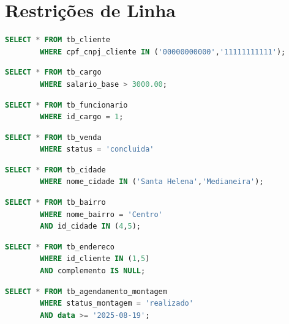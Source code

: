 \documentclass[
12pt,
a4paper,
semrecuonosumario,
sumario = abnt-6027-2012]{report}
\begin{document}
    \section{Restrições de Linha}
    
    \begin{lstlisting}[language=SQL,caption={SELECT -- Tabela\texttt{tb\_cliente}}]
        SELECT * FROM tb_cliente
        WHERE cpf_cnpj_cliente IN ('00000000000','11111111111');
    \end{lstlisting}
    
    \begin{lstlisting}[language=SQL,caption={SELECT -- Tabela \texttt{tb\_cargo}}]
        SELECT * FROM tb_cargo
        WHERE salario_base > 3000.00;
    \end{lstlisting}
    
    \begin{lstlisting}[language=SQL,caption={SELECT -- Tabela \texttt{tb\_funcionario}}]
        SELECT * FROM tb_funcionario
        WHERE id_cargo = 1;
    \end{lstlisting}
    
    \begin{lstlisting}[language=SQL,caption={SELECT -- Tabela \texttt{tb\_venda}}]
        SELECT * FROM tb_venda
        WHERE status = 'concluida'
    \end{lstlisting}
    
    \begin{lstlisting}[language=SQL,caption={SELECT -- Tabela \texttt{tb\_cidade}}]
        SELECT * FROM tb_cidade
        WHERE nome_cidade IN ('Santa Helena','Medianeira');
    \end{lstlisting}
    
    \begin{lstlisting}[language=SQL,caption={SELECT -- Tabela \texttt{tb\_bairro}}]
        SELECT * FROM tb_bairro
        WHERE nome_bairro = 'Centro'
        AND id_cidade IN (4,5);
    \end{lstlisting}
    
    \begin{lstlisting}[language=SQL,caption={SELECT -- Tabela \texttt{tb\_endereco}}]
        SELECT * FROM tb_endereco
        WHERE id_cliente IN (1,5)
        AND complemento IS NULL;
    \end{lstlisting}
    
    \begin{lstlisting}[language=SQL,caption={SELECT -- Tabela \texttt{tb\_agendamento\_montagem}}]
        SELECT * FROM tb_agendamento_montagem
        WHERE status_montagem = 'realizado'
        AND data >= '2025-08-19';
    \end{lstlisting}
    
\end{document}
